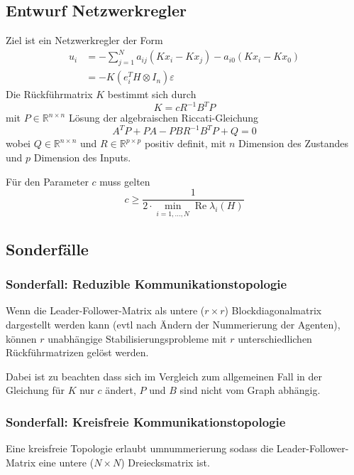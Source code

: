 \subsection{Entwurf Netzwerkregler}
\label{sec:lf_nw_regler_entwurf}
Ziel ist ein Netzwerkregler der Form
\begin{align}
    u_i &= -\sum_{j=1}^N a_{ij} (Kx_i - Kx_j) - a_{i0} (Kx_i - Kx_0) \\
        &= -K(e_i^T H \otimes I_n)\varepsilon
\end{align}
Die Rückführmatrix $K$ bestimmt sich durch
\begin{equation}
    K=c R^{-1} B^T P
\end{equation}
mit $P \in \mathbb{R}^{n\times n}$ Lösung der algebraischen Riccati-Gleichung
\begin{equation}
    \tag{ARE}
    A^T P + P A - P B R^{-1} B^T P + Q = 0
\end{equation}
wobei $Q \in \mathbb{R}^{n\times n}$ und $R \in \mathbb{R}^{p\times p}$
positiv definit, mit $n$ Dimension des Zustandes und $p$ Dimension des
Inputs.

Für den Parameter $c$ muss gelten
\begin{equation}
    c \geq \frac{1}{2 \cdot \min_{i=1,\ldots,N} \operatorname{Re} \lambda_i(H)}
\end{equation}

\subsection{Sonderfälle}
\subsubsection{Sonderfall: Reduzible Kommunikationstopologie}
Wenn die Leader-Follower-Matrix als untere ($r\times r$) Blockdiagonalmatrix
dargestellt werden kann (evtl nach Ändern der Nummerierung der Agenten),
können $r$ unabhängige Stabilisierungsprobleme mit $r$ unterschiedlichen
Rückführmatrizen gelöst werden.

Dabei ist zu beachten dass sich im Vergleich zum allgemeinen Fall in der
Gleichung für $K$ nur $c$ ändert, $P$ und $B$ sind nicht vom Graph abhängig.

\subsubsection{Sonderfall: Kreisfreie Kommunikationstopologie}
Eine kreisfreie Topologie erlaubt umnummerierung sodass die
Leader-Follower-Matrix eine untere ($N\times N$) Dreiecksmatrix ist.

